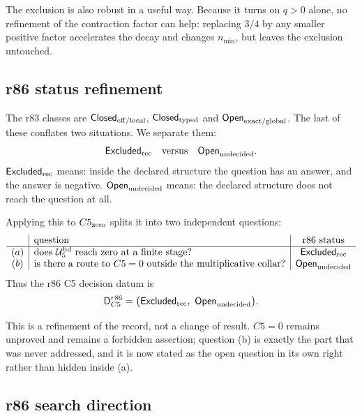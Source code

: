 The exclusion is also robust in a useful way.  Because it turns on \(q>0\) alone, no
refinement of the contraction factor can help: replacing \(3/4\) by any smaller positive
factor accelerates the decay and changes \(n_{\min}\), but leaves the exclusion untouched.

\subsection*{r86 status refinement}
\label{subsec:r86-status-refinement}

The r83 classes are \(\mathsf{Closed}_{\rm eff/local}\), \(\mathsf{Closed}_{\rm typed}\) and
\(\mathsf{Open}_{\rm exact/global}\).  The last of these conflates two situations.  We
separate them:
\[
\mathsf{Excluded}_{\rm rec}
\quad\text{versus}\quad
\mathsf{Open}_{\rm undecided}.
\]
\(\mathsf{Excluded}_{\rm rec}\) means: inside the declared structure the question has an
answer, and the answer is negative.  \(\mathsf{Open}_{\rm undecided}\) means: the declared
structure does not reach the question at all.

Applying this to \(C5_{\rm zero}\) splits it into two independent questions:
\[
\begin{array}{c|l|c}
& \text{question} & \text{r86 status}\\
\hline
(a) & \text{does }\mathcal U_5^{\rm bd}\text{ reach zero at a finite stage?} &
\mathsf{Excluded}_{\rm rec}\\
(b) & \text{is there a route to }C5=0\text{ outside the multiplicative collar?} &
\mathsf{Open}_{\rm undecided}
\end{array}
\]
Thus the r86 C5 decision datum is
\[
\mathsf D_{C5}^{r86}=\bigl(\mathsf{Excluded}_{\rm rec},\ \mathsf{Open}_{\rm undecided}\bigr).
\]

This is a refinement of the record, not a change of result.  \(C5=0\) remains unproved and
remains a forbidden assertion; question (b) is exactly the part that was never addressed, and
it is now stated as the open question in its own right rather than hidden inside (a).

\subsection*{r86 search direction}
\label{subsec:r86-search-direction}

